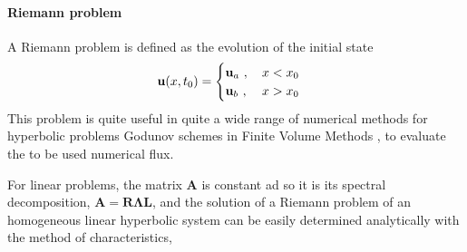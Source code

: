\documentclass[letterpaper,10pt,english]{jupyterBook}
\begin{document}
\paragraph{Riemann problem}
\label{\detokenize{ch/pde/hyperbolic-dimensions:riemann-problem}}
\sphinxAtStartPar
A Riemann problem is defined as the evolution of the initial state
\begin{equation*}
\begin{split}\mathbf{u}(x,t_0) =
  \begin{cases}
  \mathbf{u}_a \ , \hfill \quad x < x_0 \\
  \mathbf{u}_b \ , \hfill \quad x > x_0 \\
\end{cases}\end{split}
\end{equation*}
\sphinxAtStartPar
This problem is quite useful in quite a wide range of numerical methods for hyperbolic problems \sphinxhyphen{} Godunov schemes in Finite Volume Methods \sphinxhyphen{}, to evaluate the  to be used numerical flux.

\sphinxAtStartPar
For linear problems, the matrix \(\mathbf{A}\) is constant ad so it is its spectral decomposition, \(\mathbf{A} = \mathbf{R} \symbf{\Lambda} \mathbf{L}\), and the solution of a Riemann problem of an homogeneous linear hyperbolic system can be easily determined analytically with the method of characteristics,
\end{document}
